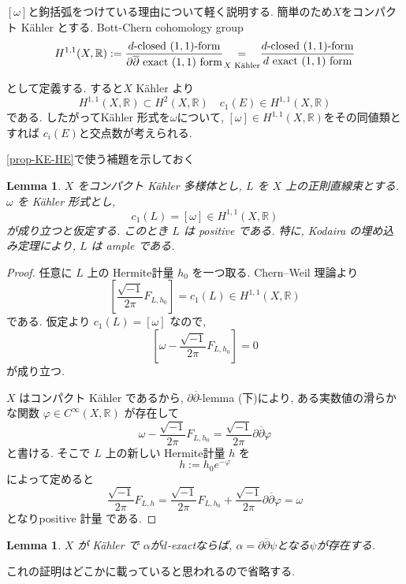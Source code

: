 \documentclass[dvipdfmx,a4paper,11pt]{article} %
\newtheorem{lem}[thm]{Lemma}
\theoremstyle{definition}
\theoremstyle{remark}
\numberwithin{equation}{section}
\newcommand{\underalign}[2]{\quad \underset{\mathclap{\strut #1}}{#2}\quad}
\newcommand{\R}{\mathbb{R}}
\begin{document}
$[\omega]$と鉤括弧をつけている理由について軽く説明する. 
簡単のため$X$をコンパクト Kähler とする. 
Bott-Chern cohomology group
$$
H^{1,1}(X, \R)
:=\frac{\text{$d$-closed $(1,1)$-form}}{\text{$\partial \overline{\partial}$ exact $(1,1)$ form}}
\underalign{\text{$X$ Kähler}}{=}
\frac{\text{$d$-closed $(1,1)$-form}}{\text{$d$ exact $(1,1)$ form}}
$$
として定義する. 
すると$X$ Kähler より
$$
H^{1,1}(X, \R)  \subset  H^{2}(X, \R)
\quad
c_1(E) \in H^{1,1}(X, \R) 
$$
である. したがってKähler 形式を$\omega$について, 
$[\omega] \in H^{1,1}(X, \R) $をその同値類とすれば
$c_i(E) $と交点数が考えられる. 

\ref{prop-KE-HE}で使う補題を示しておく
\begin{lem}
\label{lem-KE-HE-use}
\(X\) をコンパクト Kähler 多様体とし, \(L\) を \(X\) 上の正則直線束とする.
\(\omega\) を Kähler 形式とし,
\[
c_1(L)=[\omega]\in H^{1,1}(X,\mathbb R)
\]
が成り立つと仮定する.
このとき \(L\) は positive である.
特に, Kodaira の埋め込み定理により, \(L\) は ample である.
\end{lem}
\begin{proof}
任意に \(L\) 上の Hermite計量 \(h_0\) を一つ取る.
Chern--Weil 理論より
\[
[\frac{\sqrt{-1}}{2\pi}F_{L,h_0}]=c_1(L)\in H^{1,1}(X,\mathbb R)
\]
である.
仮定より
\(
c_1(L)=[\omega]
\)
なので,
\[
[\omega-\frac{\sqrt{-1}}{2\pi}F_{L,h_0}]=0
\]
が成り立つ.

\(X\) はコンパクト Kähler であるから,
\(\partial\overline\partial\)-lemma (下)により, ある実数値の滑らかな関数
\(
\varphi\in C^\infty(X,\mathbb R)
\)
が存在して
\[
\omega-\frac{\sqrt{-1}}{2\pi}F_{L,h_0}
=
\frac{\sqrt{-1}}{2\pi}
\partial\overline\partial\varphi
\]
と書ける.
そこで \(L\) 上の新しい Hermite計量 \(h\) を
\[
h:=h_0e^{-\varphi}
\]
によって定めると
$$
\frac{\sqrt{-1}}{2\pi}F_{L,h}
=\frac{\sqrt{-1}}{2\pi}F_{L,h_0}
+
\frac{\sqrt{-1}}{2\pi}
\partial\overline\partial\varphi
=\omega
$$
となりpositive 計量 である. 
\end{proof}

\begin{lem}
\label{lem-ddc-lem-2}
$X$ が Kähler で 
$\alpha$が$d$-exactならば, $\alpha= \partial \overline{\partial} \psi$となる$\psi$が存在する. 
\end{lem}
これの証明はどこかに載っていると思われるので省略する. 
\end{document}
